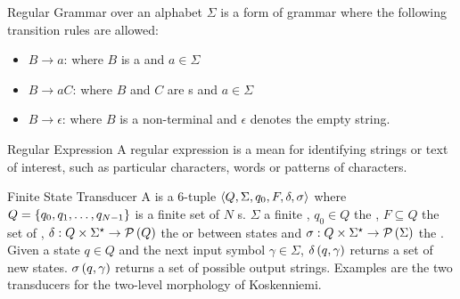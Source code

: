 \begin{df}{Regular Grammar}
\sb{} over an alphabet $\Sigma$ is a form of grammar where the following transition rules are allowed:
\begin{itemize}
 \item $B\rightarrow a$: where $B$ is a  and $a\in\Sigma$
 \item $B\rightarrow aC$: where $B$ and $C$ are s and $a\in\Sigma$
 \item $B\rightarrow \epsilon$: where $B$ is a non-terminal and $\epsilon$ denotes the empty string.
\end{itemize}
\end{df}
\begin{df}[Regexp]{Regular Expression}
A regular expression is a mean for identifying strings or text of interest, such as particular characters, words or patterns of characters.
\end{df}
\begin{df}[FST]{Finite State Transducer}
A \sb{} is a 6-tuple $\left\langle Q,\Sigma,q_0,F,\delta,\sigma\right\rangle$ where $Q=\left\{q_0,q_1,\ldots,q_{N-1}\right\}$ is a finite set of $N$ s. $\Sigma$  a finite , $q_0\in Q$ the , $F\subseteq Q$ the set of , $\delta:Q\times\Sigma^{\star}\rightarrow\mathcal{P}\left(Q\right)$ the  or  between states and $\sigma:Q\times\Sigma^{\star}\rightarrow\mathcal{P}\left(\Sigma\right)$ the . Given a state $q\in Q$ and the next input symbol $\gamma\in\Sigma$, $\delta\left(q,\gamma\right)$ returns a set of new states. $\sigma\left(q,\gamma\right)$ returns a set of possible output strings. Examples are the two transducers for the two-level morphology of Koskenniemi.
\end{df}